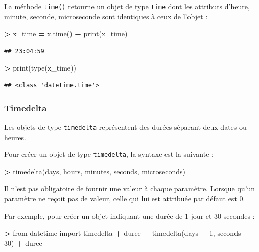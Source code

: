 \documentclass[12pt,]{book}
\newenvironment{Shaded}{\begin{snugshade}}{\end{snugshade}}
\newcommand{\DecValTok}[1]{\textcolor[rgb]{0.00,0.00,0.81}{#1}}
\newcommand{\ImportTok}[1]{#1}
\newcommand{\OperatorTok}[1]{\textcolor[rgb]{0.81,0.36,0.00}{\textbf{#1}}}
\newcommand{\BuiltInTok}[1]{#1}
\newcommand{\NormalTok}[1]{#1}
\numberwithin{equation}{section}
\numberwithin{countremarque}{section}
\begin{document}
La méthode \texttt{time()} retourne un objet de type \texttt{time} dont
les attributs d'heure, minute, seconde, microseconde sont identiques à
ceux de l'objet :

\begin{Shaded}
\begin{Highlighting}[]
\OperatorTok{>}\NormalTok{ x_time }\OperatorTok{=}\NormalTok{ x.time()}
\OperatorTok{+} \BuiltInTok{print}\NormalTok{(x_time)}
\end{Highlighting}
\end{Shaded}

\begin{lstlisting}
## 23:04:59
\end{lstlisting}

\begin{Shaded}
\begin{Highlighting}[]
\OperatorTok{>} \BuiltInTok{print}\NormalTok{(}\BuiltInTok{type}\NormalTok{(x_time))}
\end{Highlighting}
\end{Shaded}

\begin{lstlisting}
## <class 'datetime.time'>
\end{lstlisting}

\subsubsection{Timedelta}\label{timedelta}

Les objets de type \texttt{timedelta} représentent des durées séparant
deux dates ou heures.

Pour créer un objet de type \texttt{timedelta}, la syntaxe est la
suivante :

\begin{Shaded}
\begin{Highlighting}[]
\OperatorTok{>}\NormalTok{ timedelta(days, hours, minutes, seconds, microseconds)}
\end{Highlighting}
\end{Shaded}

Il n'est pas obligatoire de fournir une valeur à chaque paramètre.
Lorsque qu'un paramètre ne reçoit pas de valeur, celle qui lui est
attribuée par défaut est 0.

Par exemple, pour créer un objet indiquant une durée de 1 jour et 30
secondes :

\begin{Shaded}
\begin{Highlighting}[]
\OperatorTok{>} \ImportTok{from}\NormalTok{ datetime }\ImportTok{import}\NormalTok{ timedelta}
\OperatorTok{+}\NormalTok{ duree }\OperatorTok{=}\NormalTok{ timedelta(days }\OperatorTok{=} \DecValTok{1}\NormalTok{, seconds }\OperatorTok{=} \DecValTok{30}\NormalTok{)}
\OperatorTok{+}\NormalTok{ duree}
\end{Highlighting}
\end{Shaded}
\end{document}
